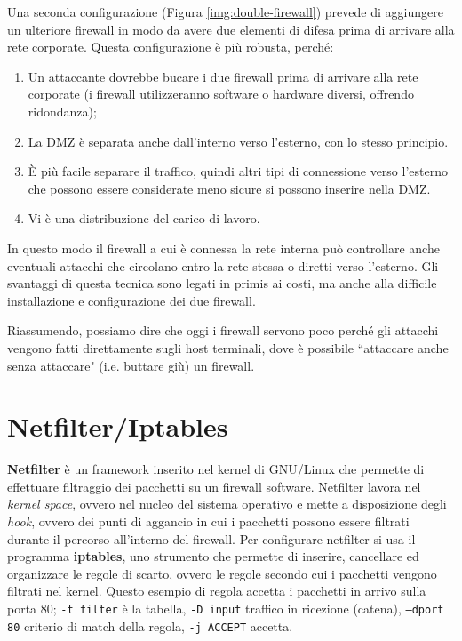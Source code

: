 Una seconda configurazione (Figura \ref{img:double-firewall}) prevede di aggiungere un ulteriore firewall in modo da avere due elementi di difesa prima di arrivare alla rete corporate. Questa configurazione è più robusta, perché:
\begin{enumerate}
	\item Un attaccante dovrebbe bucare i due firewall prima di arrivare alla rete corporate (i firewall utilizzeranno software o hardware diversi, offrendo ridondanza);
	\item La DMZ è separata anche dall'interno verso l’esterno, con lo stesso principio.
	\item È più facile separare il traffico, quindi altri tipi di connessione verso l'esterno che possono essere considerate meno sicure si possono inserire nella DMZ.
	\item Vi è una distribuzione del carico di lavoro.
\end{enumerate}
In questo modo il firewall a cui è connessa la rete interna può controllare anche eventuali attacchi che circolano entro la rete stessa o diretti verso l'esterno. Gli svantaggi di questa tecnica sono legati in primis ai costi, ma anche alla difficile installazione e configurazione dei due firewall.

Riassumendo, possiamo dire che oggi i firewall servono poco perché gli attacchi vengono fatti direttamente sugli host terminali, dove è possibile \textquotedblleft attaccare anche senza attaccare" (i.e. buttare giù) un firewall.

\section{Netfilter/Iptables}
\textbf{Netfilter} è un framework inserito nel kernel di GNU/Linux che permette di effettuare filtraggio dei pacchetti su un firewall software. Netfilter lavora nel \textit{kernel space}, ovvero nel nucleo del sistema operativo e mette a disposizione degli \textit{hook}, ovvero dei punti di aggancio in cui i pacchetti possono essere filtrati durante il percorso all'interno del firewall. Per configurare netfilter si usa il programma \textbf{iptables}, uno strumento che permette di inserire, cancellare ed organizzare le regole di scarto, ovvero le regole secondo cui i pacchetti vengono filtrati nel kernel. Questo esempio di regola
accetta i pacchetti in arrivo sulla porta 80; \texttt{-t filter} è la tabella, \texttt{-D input} traffico in ricezione (catena), \texttt{--dport 80} criterio di match della regola, \texttt{-j ACCEPT} accetta.

